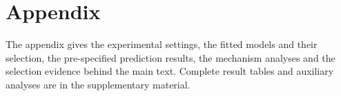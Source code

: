 \documentclass{article} %
\begin{document}
\section*{Appendix}
\suppressfloats[t]

\noindent The appendix gives the experimental settings, the fitted models and their
selection, the pre-specified prediction results, the mechanism analyses and the selection evidence
behind the main text. Complete result tables and auxiliary analyses are in the supplementary
material.


\end{document}
